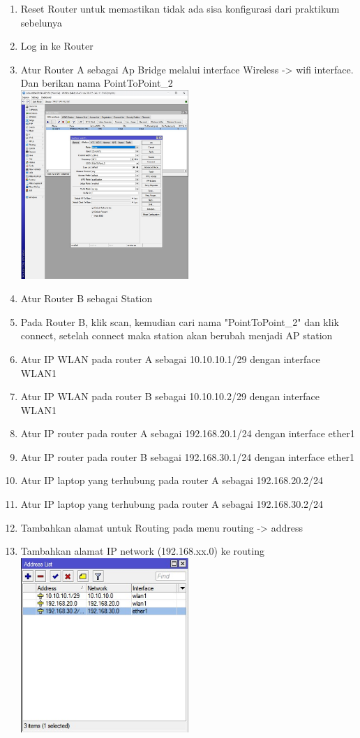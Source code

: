 \begin{enumerate}
	\item Reset Router untuk memastikan tidak ada sisa konfigurasi dari praktikum sebelunya
	\item Log in ke Router
	\item Atur Router A sebagai Ap Bridge melalui interface Wireless -> wifi interface. Dan berikan nama PointToPoint\_2\\
	\includegraphics[width=0.5\textwidth]{p4/img/bridge.jpg}
	\item Atur Router B sebagai Station
	\item Pada Router B, klik scan, kemudian cari nama "PointToPoint\_2" dan klik connect, setelah connect maka station akan berubah menjadi AP station
	\item Atur IP WLAN pada router A sebagai 10.10.10.1/29 dengan interface WLAN1
	\item Atur IP WLAN pada router B sebagai 10.10.10.2/29 dengan interface WLAN1
	\item Atur IP router pada router A sebagai 192.168.20.1/24 dengan interface ether1
	\item Atur IP router pada router B sebagai 192.168.30.1/24 dengan interface ether1
	\item Atur IP laptop yang terhubung pada router A sebagai 192.168.20.2/24
	\item Atur IP laptop yang terhubung pada router A sebagai 192.168.30.2/24
	\item Tambahkan alamat untuk Routing pada menu routing -> address\\
	\item Tambahkan alamat IP network (192.168.xx.0) ke routing\\
	\includegraphics[width=0.5\textwidth]{p4/img/address.jpg}

\end{enumerate}
